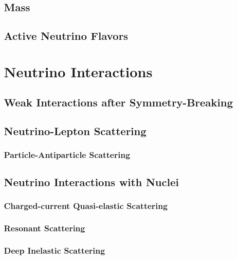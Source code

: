\subsection{Mass}

\subsection{Active Neutrino Flavors}


\section{Neutrino Interactions}

\subsection{Weak Interactions after Symmetry-Breaking}

\subsection{Neutrino-Lepton Scattering}

\subsubsection{Particle-Antiparticle Scattering}


\subsection{Neutrino Interactions with Nuclei}

\subsubsection{Charged-current Quasi-elastic Scattering}

\subsubsection{Resonant Scattering}

\subsubsection{Deep Inelastic Scattering}
